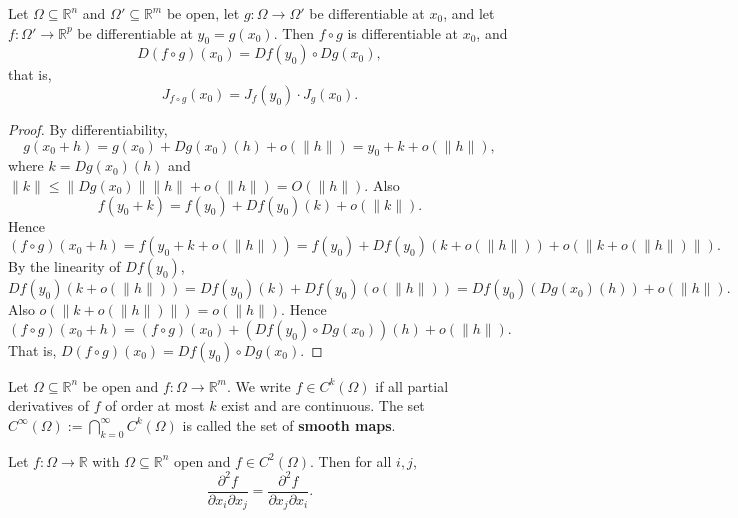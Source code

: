 \begin{theorem}\label{thm:chain_rule_ra}
Let $\Omega \subseteq \mathbb{R}^n$ and $\Omega' \subseteq \mathbb{R}^m$ be open, let $g: \Omega \to \Omega'$ be differentiable at $x_0$, and let $f: \Omega' \to \mathbb{R}^p$ be differentiable at $y_0 = g(x_0)$. Then $f \circ g$ is differentiable at $x_0$, and
\[
D(f \circ g)(x_0) = Df(y_0) \circ Dg(x_0),
\]
that is,
\[
J_{f \circ g}(x_0) = J_f(y_0) \cdot J_g(x_0).
\]
\end{theorem}

\begin{proof}
By differentiability,
\[
g(x_0 + h) = g(x_0) + Dg(x_0)(h) + o(\|h\|) = y_0 + k + o(\|h\|),
\]
where $k = Dg(x_0)(h)$ and $\|k\| \le \|Dg(x_0)\| \|h\| + o(\|h\|) = O(\|h\|)$. Also
\[
f(y_0 + k) = f(y_0) + Df(y_0)(k) + o(\|k\|).
\]
Hence
\[
(f \circ g)(x_0 + h) = f(y_0 + k + o(\|h\|)) = f(y_0) + Df(y_0)(k + o(\|h\|)) + o(\|k + o(\|h\|)\|).
\]
By the linearity of $Df(y_0)$,
\[
Df(y_0)(k + o(\|h\|)) = Df(y_0)(k) + Df(y_0)(o(\|h\|)) = Df(y_0)(Dg(x_0)(h)) + o(\|h\|).
\]
Also $o(\|k + o(\|h\|)\|) = o(\|h\|)$. Hence
\[
(f \circ g)(x_0 + h) = (f \circ g)(x_0) + (Df(y_0) \circ Dg(x_0))(h) + o(\|h\|).
\]
That is, $D(f \circ g)(x_0) = Df(y_0) \circ Dg(x_0)$.
\end{proof}

\begin{definition}[$C^k$ map]\label{def:ck_mapping}
Let $\Omega \subseteq \mathbb{R}^n$ be open and $f: \Omega \to \mathbb{R}^m$. We write $f \in C^k(\Omega)$ if all partial derivatives of $f$ of order at most $k$ exist and are continuous. The set $C^\infty(\Omega) := \bigcap_{k=0}^{\infty} C^k(\Omega)$ is called the set of \textbf{smooth maps}.
\end{definition}

\begin{theorem}\label{thm:clairaut_ra}
Let $f: \Omega \to \mathbb{R}$ with $\Omega \subseteq \mathbb{R}^n$ open and $f \in C^2(\Omega)$. Then for all $i, j$,
\[
\frac{\partial^2 f}{\partial x_i \partial x_j} = \frac{\partial^2 f}{\partial x_j \partial x_i}.
\]
\end{theorem}

